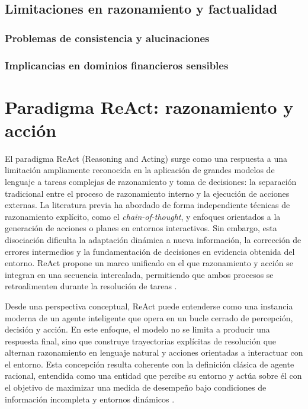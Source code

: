 \documentclass[
	spanish, %
	letterpaper, oneside
]{book}
\begin{document}
\subsection{Limitaciones en razonamiento y factualidad}

\subsubsection{Problemas de consistencia y alucinaciones}
\subsubsection{Implicancias en dominios financieros sensibles}

\section{Paradigma ReAct: razonamiento y acción}

El paradigma ReAct (Reasoning and Acting) surge como una respuesta a una limitación ampliamente reconocida en la aplicación de grandes modelos de lenguaje a tareas complejas de razonamiento y toma de decisiones: la separación tradicional entre el proceso de razonamiento interno y la ejecución de acciones externas. La literatura previa ha abordado de forma independiente técnicas de razonamiento explícito, como el \emph{chain-of-thought}, y enfoques orientados a la generación de acciones o planes en entornos interactivos. Sin embargo, esta disociación dificulta la adaptación dinámica a nueva información, la corrección de errores intermedios y la fundamentación de decisiones en evidencia obtenida del entorno. ReAct propone un marco unificado en el que razonamiento y acción se integran en una secuencia intercalada, permitiendo que ambos procesos se retroalimenten durante la resolución de tareas \cite{yao2023react}.

Desde una perspectiva conceptual, ReAct puede entenderse como una instancia moderna de un agente inteligente que opera en un bucle cerrado de percepción, decisión y acción. En este enfoque, el modelo no se limita a producir una respuesta final, sino que construye trayectorias explícitas de resolución que alternan razonamiento en lenguaje natural y acciones orientadas a interactuar con el entorno. Esta concepción resulta coherente con la definición clásica de agente racional, entendida como una entidad que percibe su entorno y actúa sobre él con el objetivo de maximizar una medida de desempeño bajo condiciones de información incompleta y entornos dinámicos \cite{russell2010aima}.
\end{document}

